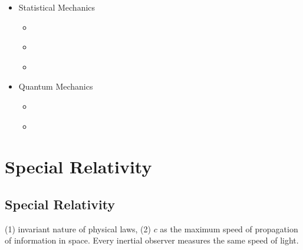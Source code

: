\documentclass[letterpaper,10pt,english]{jupyterBook}
\begin{document}
\begin{itemize}
\item {} 
\sphinxAtStartPar
Statistical Mechanics

\begin{itemize}
\item {} 
\sphinxAtStartPar
{\hyperref[\detokenize{ch/statistical-mechanics/intro::doc}]{}}

\item {} 
\sphinxAtStartPar
{\hyperref[\detokenize{ch/statistical-mechanics/notes::doc}]{}}

\item {} 
\sphinxAtStartPar
{\hyperref[\detokenize{ch/statistical-mechanics/statistics::doc}]{}}

\end{itemize}
\end{itemize}
\begin{itemize}
\item {} 
\sphinxAtStartPar
Quantum Mechanics

\begin{itemize}
\item {} 
\sphinxAtStartPar
{\hyperref[\detokenize{ch/quantum-mechanics/intro::doc}]{}}

\item {} 
\sphinxAtStartPar
{\hyperref[\detokenize{ch/quantum-mechanics/notes::doc}]{}}

\end{itemize}
\end{itemize}

\sphinxstepscope


\part{Special Relativity}

\sphinxstepscope


\chapter{Special Relativity}
\label{\detokenize{ch/relativity-special/intro:special-relativity}}\label{\detokenize{ch/relativity-special/intro:relativity-special}}\label{\detokenize{ch/relativity-special/intro::doc}}
\sphinxAtStartPar
{} (1) invariant nature of physical laws, (2) \(c\) as the maximum speed of propagation of information in space. Every inertial observer measures the same speed of light.
\end{document}
